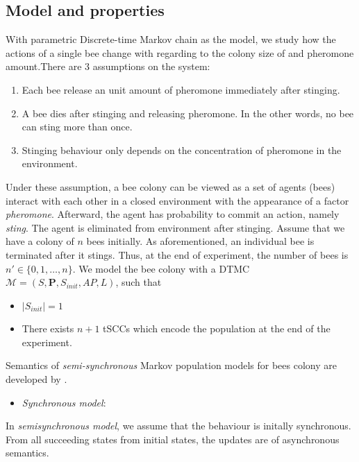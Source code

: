 \subsection{Model and properties}
With parametric Discrete-time Markov chain as the model, we study how the actions of a single bee
change with regarding to the colony size of and pheromone amount.There are 3 assumptions on the
system:
\begin{enumerate}
    \item Each bee release an unit amount of pheromone immediately after stinging.
    \item A bee dies after stinging and releasing pheromone. In the other words, no bee can sting
          more than once.
    \item Stinging behaviour only depends on the concentration of pheromone in the environment.
\end{enumerate}
Under these assumption, a bee colony can be viewed as a set of agents (bees) interact with each
other in a closed environment with the appearance of a factor \textit{pheromone}. Afterward, the
agent has probability to commit an action, namely \textit{sting}. The agent is eliminated from
environment after stinging. Assume that we have a colony of $n$ bees initially. As aforementioned,
an individual bee is terminated after it stings. Thus, at the end of experiment, the number of bees
is $n'\in\{0,1,\ldots,n\}$. We model the bee colony with a DTMC $\mathcal{M}=(S,\mathbf{P},
    S_{init}, AP,L)$, such that
\begin{itemize}
    \item $|S_{init}|=1$
    \item There exists $n+1$ tSCCs which encode the population at the end of the experiment.
\end{itemize}
Semantics of \textit{semi-synchronous} Markov population models for bees colony are developed by
\cite{hajnal2019data}.
\begin{itemize}
    \item \textit{Synchronous model}:
\end{itemize}
In \textit{semisynchronous model}, we assume that the behaviour is initally synchronous. From all
succeeding states from initial states, the updates are of asynchronous semantics.
